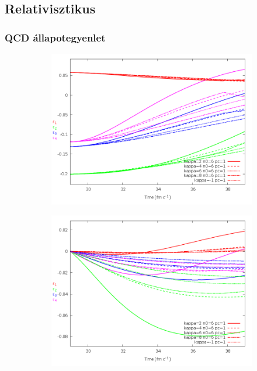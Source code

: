 \documentclass{beamer}
\begin{document}
\subsection{Relativisztikus}
\begin{frame}
\frametitle{QCD állapotegyenlet}
\begin{center}
\begin{itemize}
\setlength{\itemsep}{12pt}

\end{itemize}
\begin{figure}[H]
	\centering
    \begin{subfigure}[b]{0.49\textwidth}
    		\includegraphics[width=\textwidth]{pic/summer/qcd_p}
	\end{subfigure}
	\begin{subfigure}[b]{0.49\textwidth}
        	\includegraphics[width=\textwidth]{pic/summer/qcd_v}
	\end{subfigure}
\end{figure}
\end{center}
\end{frame}
\end{document}

